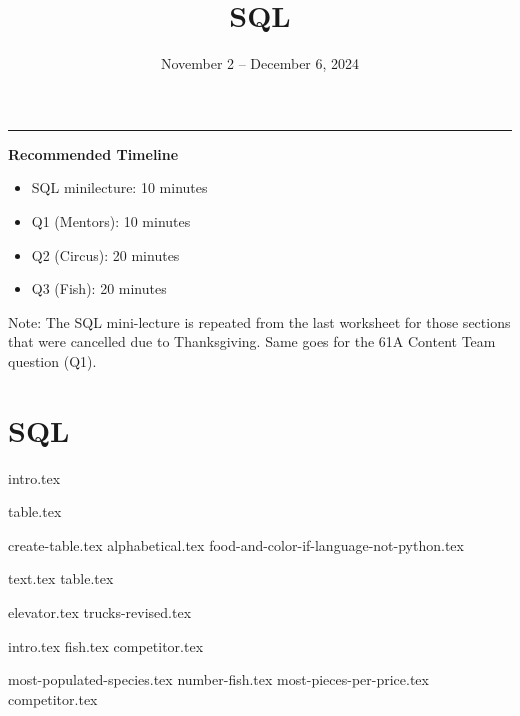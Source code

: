 \documentclass{exam}
\title{SQL}
\date{November 2 -- December 6, 2024}
\begin{document}
\maketitle\rule{\textwidth}{0.15em}

\begin{guide}
    \textbf{Recommended Timeline}
    \begin{itemize}
        \item SQL minilecture: 10 minutes
        \item Q1 (Mentors): 10 minutes
        \item Q2 (Circus): 20 minutes
        \item Q3 (Fish): 20 minutes
    \end{itemize}
    Note: The SQL mini-lecture is repeated from the last worksheet for those sections that were cancelled due to Thanksgiving. Same goes for the 61A Content Team question (Q1).
\end{guide}

\section{SQL}
{intro.tex}
\newpage
\begin{questions}
  \question
  {table.tex}
  \begin{parts}
    {create-table.tex}
    {alphabetical.tex}
    {food-and-color-if-language-not-python.tex}
  \end{parts}

  \newpage
  \question
  {text.tex}
  {table.tex}
  \begin{parts}
    {elevator.tex}
    {trucks-revised.tex}
  \end{parts}
  
  \newpage
  \question 
  {intro.tex}
  {fish.tex}
  {competitor.tex}
  \begin{parts}
    {most-populated-species.tex}
    {number-fish.tex}
    {most-pieces-per-price.tex}
    {competitor.tex}
  \end{parts}
\end{questions}
\end{document}
